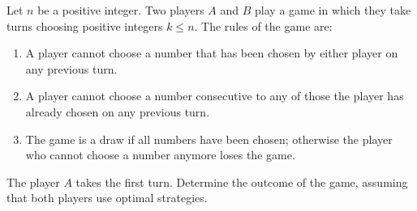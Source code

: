 Let $n$ be a positive integer. Two players $A$ and $B$ play a game in which they take turns choosing positive integers $k \leq n$. The rules of the game are:

\begin{enumerate}
\item[(i)] A player cannot choose a number that has been chosen by either player on any previous turn.
\item[(ii)] A player cannot choose a number consecutive to any of those the player has already chosen on any previous turn.
\item[(iii)] The game is a draw if all numbers have been chosen; otherwise the player who cannot choose a number anymore loses the game.
\end{enumerate}

The player $A$ takes the first turn. Determine the outcome of the game, assuming that both players use optimal strategies.
